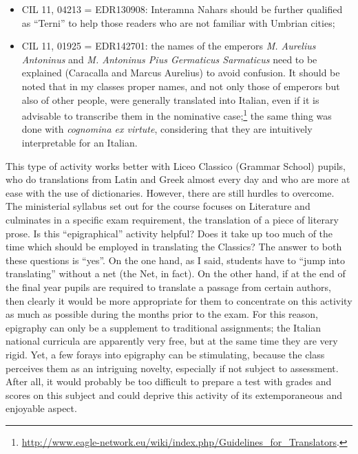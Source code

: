 \documentclass[amsthm,ebook]{saparticle}
\begin{document}
\begin{itemize}
\item  CIL 11, 04213 = EDR130908: Interamna Nahars should be further qualified as ``Terni'' to
help those readers who are not familiar with Umbrian cities;

\item CIL 11, 01925 = EDR142701: the names of the emperors \emph{M. Aurelius Antoninus} and \emph{M.
Antoninus Pius Germaticus Sarmaticus} need to be explained (Caracalla and Marcus Aurelius) to avoid confusion. It should
be noted that in my classes proper names, and not only those of emperors but also of other people, were generally
translated into Italian, even if it is advisable to transcribe them in the nominative case;\footnote{
\url{http://www.eagle-network.eu/wiki/index.php/Guidelines\_for\_Translators}.} the same thing was done with \emph{cognomina ex
virtute}, considering that they are intuitively interpretable for an Italian.
\end{itemize}





This type of activity works better with Liceo Classico (Grammar School) pupils, who do translations from Latin and Greek
almost every day and who are more at ease with the use of dictionaries. However, there are still hurdles to overcome.
The ministerial syllabus set out for the course focuses on Literature and culminates in a specific exam requirement,
the translation of a piece of literary prose. Is this ``epigraphical'' activity helpful? Does it take up too much of the
time which should be employed in translating the Classics? The answer to both these questions is ``yes''. On the one
hand, as I said, students have to ``jump into translating'' without a net (the Net, in fact). On the other hand, if at
the end of the final year pupils are required to translate a passage from certain authors, then clearly it would be
more appropriate for them to concentrate on this activity as much as possible during the months prior to the exam. For
this reason, epigraphy can only be a supplement to traditional assignments; the Italian national curricula are
apparently very free, but at the same time they are very rigid. Yet, a few forays into epigraphy can be stimulating,
because the class perceives them as an intriguing novelty, especially if not subject to assessment. After all, it would
probably be too difficult to prepare a test with grades and scores on this subject and could deprive this activity of
its extemporaneous and enjoyable aspect.
\end{document}
